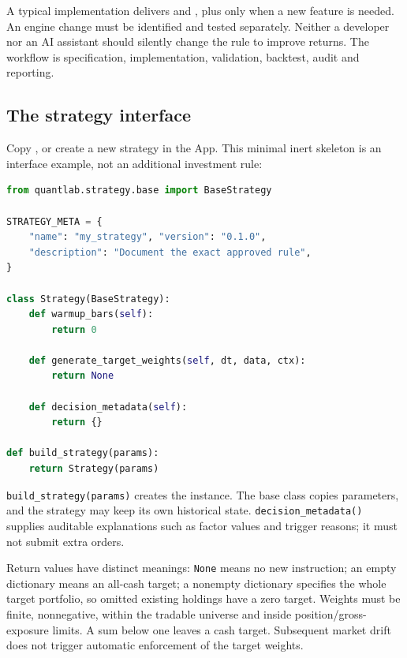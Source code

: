 \documentclass[11pt]{article}
\newcommand{\code}[1]{\nolinkurl{#1}}
\let\originalsubsection\subsection
\renewcommand{\subsection}{\Needspace{8\baselineskip}\originalsubsection}
\begin{document}
A typical implementation delivers  and , plus  only when a new feature is needed. An engine change must be identified and tested separately. Neither a developer nor an AI assistant should silently change the rule to improve returns. The workflow is specification, implementation, validation, backtest, audit and reporting.

\subsection{The strategy interface}
Copy , or create a new strategy in the App. This minimal inert skeleton is an interface example, not an additional investment rule:
\begin{lstlisting}[language=Python]
from quantlab.strategy.base import BaseStrategy

STRATEGY_META = {
    "name": "my_strategy", "version": "0.1.0",
    "description": "Document the exact approved rule",
}

class Strategy(BaseStrategy):
    def warmup_bars(self):
        return 0

    def generate_target_weights(self, dt, data, ctx):
        return None

    def decision_metadata(self):
        return {}

def build_strategy(params):
    return Strategy(params)
\end{lstlisting}
\code{build_strategy(params)} creates the instance. The base class copies parameters, and the strategy may keep its own historical state. \code{decision_metadata()} supplies auditable explanations such as factor values and trigger reasons; it must not submit extra orders.

Return values have distinct meanings: \code{None} means no new instruction; an empty dictionary means an all-cash target; a nonempty dictionary specifies the whole target portfolio, so omitted existing holdings have a zero target. Weights must be finite, nonnegative, within the tradable universe and inside position/gross-exposure limits. A sum below one leaves a cash target. Subsequent market drift does not trigger automatic enforcement of the target weights.
\end{document}
